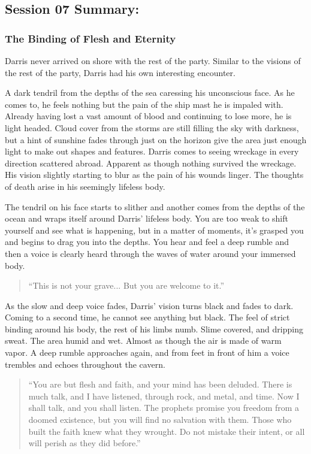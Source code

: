 \subsection{Session 07 Summary: }

\subsubsection{The Binding of Flesh and Eternity}

Darris never arrived on shore with the rest of the party. Similar to the visions of the rest of the party, Darris had his own interesting encounter.

A dark tendril from the depths of the sea caressing his unconscious face. As he comes to, he feels nothing but the pain of the ship mast he is impaled with. Already having lost a vast amount of blood and continuing to lose more, he is light headed. Cloud cover from the storms are still filling the sky with darkness, but a hint of sunshine fades through just on the horizon give the area just enough light to make out shapes and features. Darris comes to seeing wreckage in every direction scattered abroad. Apparent as though nothing survived the wreckage. His vision slightly starting to blur as the pain of his wounds linger. The thoughts of death arise in his seemingly lifeless body.

The tendril on his face starts to slither and another comes from the depths of the ocean and wraps itself around Darris' lifeless body. You are too weak to shift yourself and see what is happening, but in a matter of moments, it's grasped you and begins to drag you into the depths. You hear and feel a deep rumble and then a voice is clearly heard through the waves of water around your immersed body.

\begin{quote}
	``This is not your grave... But you are welcome to it.''
\end{quote}

As the slow and deep voice fades, Darris' vision turns black and fades to dark. Coming to a second time, he cannot see anything but black. The feel of strict binding around his body, the rest of his limbs numb. Slime covered, and dripping sweat. The area humid and wet. Almost as though the air is made of warm vapor. A deep rumble approaches again, and from feet in front of him a voice trembles and echoes throughout the cavern. 

\begin{quote}
	``You are but flesh and faith, and your mind has been deluded. There is much talk, and I have listened, through rock, and metal, and time. Now I shall talk, and you shall listen. The prophets promise you freedom from a doomed existence, but you will find no salvation with them. Those who built the faith knew what they wrought. Do not mistake their intent, or all will perish as they did before.''
\end{quote}
	
